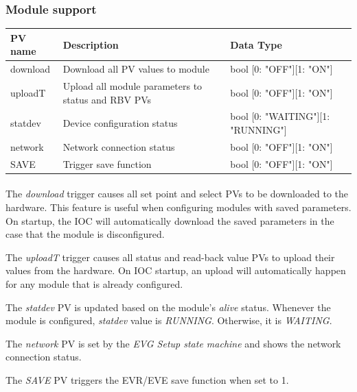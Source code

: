\documentclass[openany]{article}
\begin{document}
		\subsubsection{Module support}\label{pvgroup:evre-module-support}
			\begin{center}
			\begin{tabular}{| m{2.8cm} m{6cm} m{6cm} |}
			    \hline
			    \bfseries PV name & \bfseries Description & \bfseries Data Type \\ \hline
			    download & Download all PV values to module & bool [0: "OFF"][1: "ON"] \\ \hline
			    uploadT & Upload all module parameters to status and RBV PVs & bool [0: "OFF"][1: "ON"] \\ \hline
			    statdev & Device configuration status & bool [0: "WAITING"][1: "RUNNING"] \\ \hline
			    network & Network connection status & bool [0: "OFF"][1: "ON"] \\ \hline
			    SAVE & Trigger save function & bool [0: "OFF"][1: "ON"] \\ \hline
			\end{tabular}
			\end{center}

			\paragraph{} The \emph{download} trigger causes all set point and select PVs to be downloaded to the hardware. This feature is useful when configuring modules with saved parameters. On startup, the IOC will automatically download the saved parameters in the case that the module is disconfigured.
			\par The \emph{uploadT} trigger causes all status and read-back value PVs to upload their values from the hardware. On IOC startup, an upload will automatically happen for any module that is already configured.
			\par The \emph{statdev} PV is updated based on the module's \emph{alive} status. Whenever the module is configured, \emph{statdev} value is \emph{RUNNING}. Otherwise, it is \emph{WAITING}.
			\par The \emph{network} PV is set by the \emph{EVG Setup state machine} and shows the network connection status.
			\par The \emph{SAVE} PV triggers the EVR/EVE save function when set to 1.
\end{document}
